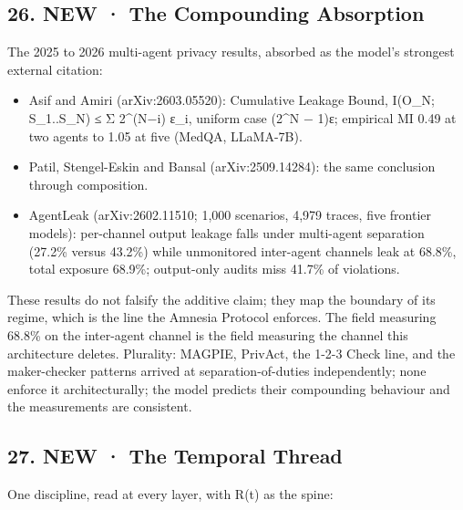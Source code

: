 \documentclass[
  11pt,
]{article}
\newcounter{none} %
\providecommand{\tightlist}{%
  \setlength{\itemsep}{0pt}\setlength{\parskip}{0pt}}
\begin{document}
\subsection{26. NEW · The Compounding
Absorption}\label{new-the-compounding-absorption}

The 2025 to 2026 multi-agent privacy results, absorbed as the model's
strongest external citation:

\begin{itemize}
\tightlist
\item
  Asif and Amiri (arXiv:2603.05520): Cumulative Leakage Bound, I(O\_N;
  S\_1..S\_N) ≤ Σ 2\^{}(N−i) ε\_i, uniform case (2\^{}N − 1)ε; empirical
  MI 0.49 at two agents to 1.05 at five (MedQA, LLaMA-7B).
\item
  Patil, Stengel-Eskin and Bansal (arXiv:2509.14284): the same
  conclusion through composition.
\item
  AgentLeak (arXiv:2602.11510; 1,000 scenarios, 4,979 traces, five
  frontier models): per-channel output leakage falls under multi-agent
  separation (27.2\% versus 43.2\%) while unmonitored inter-agent
  channels leak at 68.8\%, total exposure 68.9\%; output-only audits
  miss 41.7\% of violations.
\end{itemize}

These results do not falsify the additive claim; they map the boundary
of its regime, which is the line the Amnesia Protocol enforces. The
field measuring 68.8\% on the inter-agent channel is the field measuring
the channel this architecture deletes. Plurality: MAGPIE, PrivAct, the
1-2-3 Check line, and the maker-checker patterns arrived at
separation-of-duties independently; none enforce it architecturally; the
model predicts their compounding behaviour and the measurements are
consistent.

\subsection{27. NEW · The Temporal
Thread}\label{new-the-temporal-thread}

One discipline, read at every layer, with R(t) as the spine:
\end{document}
